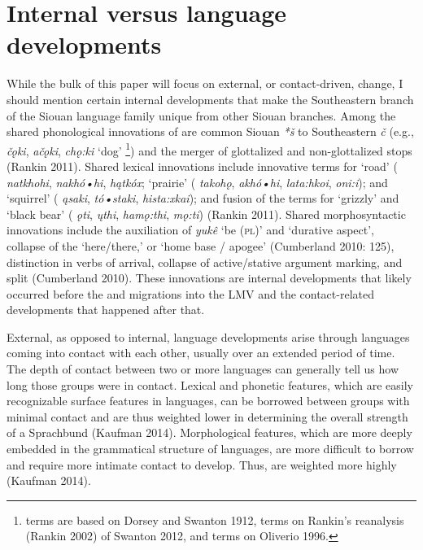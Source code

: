 \documentclass[output=paper]{LSP/langsci}
\begin{document}
\section{Internal versus language developments}

While the bulk of this paper will focus on external, or contact-driven, change, I should mention certain internal developments that make the Southeastern branch of the Siouan language family unique from other Siouan branches. Among the shared phonological innovations of  are common Siouan \emph{*š} to Southeastern \emph{č} (e.g.,  \emph{čǫki},  \emph{ačǫki},  \emph{chǫ:ki} `dog' \footnote{ terms are based on Dorsey and Swanton 1912,  terms on Rankin’s reanalysis (Rankin 2002) of Swanton 2012, and  terms on Oliverio 1996.}) and the merger of glottalized and non-glottalized stops (Rankin 2011). Shared lexical innovations include innovative terms for `road' ( \emph{natkhohi},  \emph{nakhó•hi},  \emph{hątkóx}; `prairie' ( \emph{takohǫ},  \emph{akhó•hi},  \emph{lata:hkoi}, \emph{oni:i}); and `squirrel' ( \emph{ąsaki},  \emph{tó•staki},  \emph{hista:xkai}); and fusion of the terms for `grizzly' and `black bear' ( \emph{ǫti},  \emph{ųthi},  \emph{hamǫ:thi}, \emph{mǫ:ti}) (Rankin 2011). Shared morphosyntactic innovations include the auxiliation of \emph{yukê} `be (\textsc{pl})' and `durative aspect', collapse of the `here/there,' or `home base / apogee' (Cumberland 2010: 125), distinction in verbs of arrival, collapse of active/stative argument marking, and split  (Cumberland 2010). These innovations are internal developments that likely occurred before the  and  migrations into the LMV and the contact-related developments that happened after that.

External, as opposed to internal, language developments arise through languages coming into contact with each other, usually over an extended period of time. The depth of contact between two or more languages can generally tell us how long those groups were in contact. Lexical and phonetic features, which are easily recognizable surface features in languages, can be borrowed between groups with minimal contact and are thus weighted lower in determining the overall strength of a Sprachbund (Kaufman 2014). Morphological features, which are more deeply embedded in the grammatical structure of languages, are more difficult to borrow and require more intimate contact to develop. Thus,  are weighted more highly (Kaufman 2014).
\end{document}
